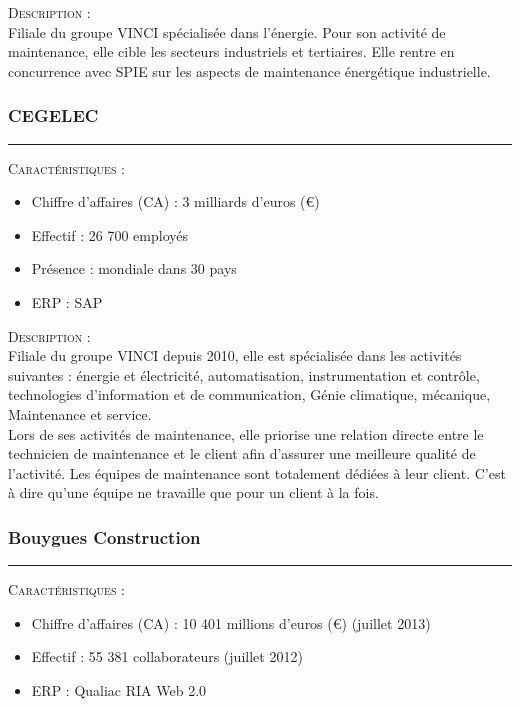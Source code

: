 \noindent\textsc{Description} : \\

Filiale du groupe VINCI spécialisée dans l’énergie. Pour son activité de maintenance, elle cible les secteurs industriels et tertiaires. Elle rentre en concurrence avec SPIE sur les aspects de maintenance énergétique industrielle.

\subsubsection{CEGELEC}
\hrule

\begin{shaded}
    \noindent\textsc{Caractéristiques} : \\
    \begin{itemize}
        \item Chiffre d'affaires (CA) : 3 milliards d'euros (€)
        \item Effectif : 26 700 employés
        \item Présence : mondiale dans 30 pays
        \item ERP : SAP
    \end{itemize}
\end{shaded}

\noindent\textsc{Description} : \\

Filiale du groupe VINCI depuis 2010, elle est spécialisée dans les activités suivantes : énergie et électricité, automatisation, instrumentation et contrôle, technologies d’information et de communication, Génie climatique, mécanique, Maintenance et service. \\

Lors de ses activités de maintenance, elle priorise une relation directe entre le technicien de maintenance et le client afin d’assurer une meilleure qualité de l’activité. Les équipes de maintenance sont totalement dédiées à leur client. C’est à dire qu’une équipe ne travaille que pour un client à la fois.

\subsubsection{Bouygues Construction}
\hrule

\begin{shaded}
    \noindent\textsc{Caractéristiques} : \\
    \begin{itemize}
        \item Chiffre d'affaires (CA) : 10 401 millions d'euros (€) (juillet 2013)
        \item Effectif : 55 381 collaborateurs (juillet 2012)
        \item ERP : Qualiac RIA Web 2.0
    \end{itemize}
\end{shaded}

